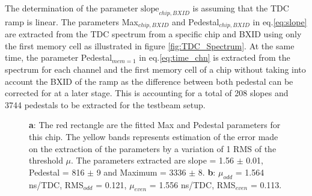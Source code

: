 The determination of the parameter $\text{slope}_{chip, BXID}$ is assuming that the TDC ramp is linear. The parameters Max$_{chip, BXID}$ and Pedestal$_{chip, BXID}$ in eq.\ref{eq:slope} are extracted from the TDC spectrum from a specific chip and BXID using only the first memory cell as illustrated in figure \ref{fig:TDC_Spectrum}. At the same time, the parameter Pedestal$_{mem=1}$ in eq.\ref{eq:time_chn} is extracted from the spectrum for each channel and the first memory cell of a chip without taking into account the BXID of the ramp as the difference between both pedestal can be corrected for at a later stage. This is accounting for a total of 208 slopes and 3744 pedestals to be extracted for the testbeam setup.
\begin{figure}[!htbp]
	\hfill
	\caption[]{\textbf{a}: The red rectangle are the fitted Max and Pedestal parameters for this chip. The yellow bands represents estimation of the error made on the extraction of the parameters by a variation of 1 RMS of the threshold $\mu$. The parameters extracted are slope = 1.56 $\pm$ 0.01, Pedestal = 816 $\pm$ 9 and Maximum = 3336 $\pm$ 8. \textbf{b}: $\mu_{odd}$ = 1.564 ns/TDC, RMS$_{odd}$ = 0.121, $\mu_{even}$ = 1.556 ns/TDC, RMS$_{even}$ = 0.113.}
\end{figure}

